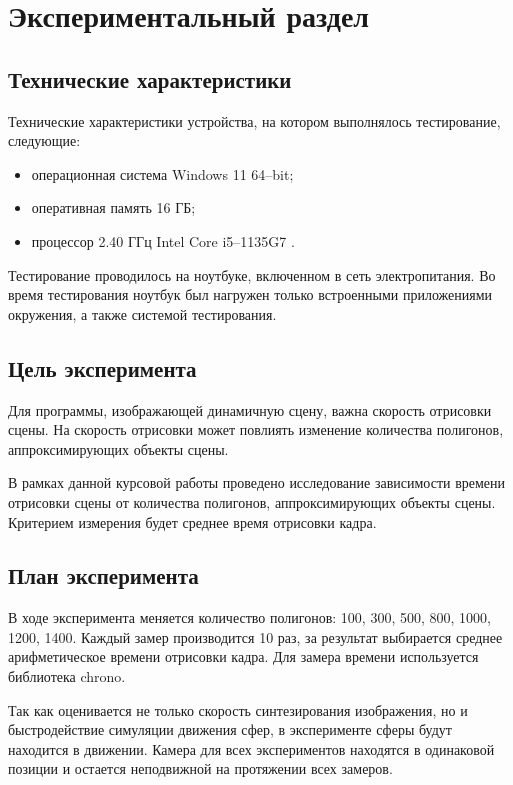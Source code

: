 \chapter{Экспериментальный раздел}

\section{Технические характеристики}

Технические характеристики устройства, на котором выполнялось тестирование, следующие:

\begin{itemize}[label=---]
	\item операционная система Windows 11  64–bit;
	\item оперативная память 16 ГБ;
	\item процессор 2.40 ГГц Intel Core i5–1135G7 \cite{intel}.
\end{itemize}

Тестирование проводилось на ноутбуке, включенном в сеть электропитания. Во время тестирования ноутбук был нагружен только встроенными приложениями окружения, а также системой тестирования.


\section{Цель эксперимента}

Для программы, изображающей динамичную сцену, важна скорость отрисовки сцены. На скорость отрисовки  может повлиять изменение количества полигонов, аппроксимирующих объекты сцены. 

В рамках данной курсовой работы проведено исследование зависимости времени отрисовки сцены от количества полигонов, аппроксимирующих объекты сцены. Критерием измерения будет среднее время отрисовки кадра.


\section{План эксперимента}

В ходе эксперимента меняется количество полигонов: 100, 300, 500, 800, 1000, 1200, 1400. Каждый замер производится 10 раз, за результат выбирается среднее арифметическое времени отрисовки кадра. Для замера времени используется библиотека chrono.

Так как оценивается не только скорость синтезирования изображения, но
и быстродействие симуляции движения сфер, в эксперименте сферы будут находится в движении. Камера для всех экспериментов находятся в одинаковой позиции и остается неподвижной на протяжении всех замеров.


